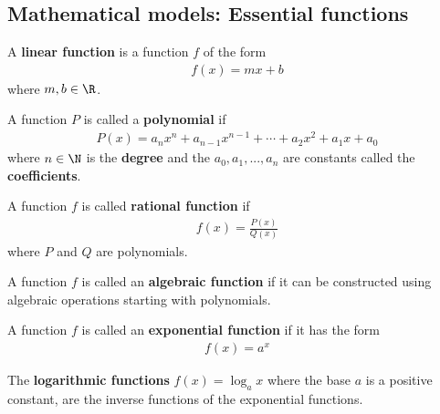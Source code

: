 \documentclass{article}
\begin{document}
\subsection{Mathematical models: Essential functions}
\begin{definition}
    A \textbf{linear function} is a function $f$ of the form
    \begin{align*}
        f(x) = mx + b
    \end{align*}
    where $m, b\in\R$.
\end{definition}
\begin{definition}
    A function $P$ is called a \textbf{polynomial} if
    \begin{align*}
        P(x) = a_nx^n+a_{n-1}x^{n-1}+\cdots +a_2x^2 + a_1x+a_0
    \end{align*}
    where $n\in\N$ is the \textbf{degree} and the $a_0, a_1, ..., a_n$ are constants called the \textbf{coefficients}.
\end{definition}
\begin{definition}
    A function $f$ is called \textbf{rational function} if
    \begin{align*}
        f(x) = \frac{P(x)}{Q(x)}
    \end{align*}
    where $P$ and $Q$ are polynomials.
\end{definition}
\begin{definition}
    A function $f$ is called an \textbf{algebraic function} if it can be constructed using algebraic operations starting with polynomials.
\end{definition}
\begin{definition}
    A function $f$ is called an \textbf{exponential function} if it has the form
    \begin{align*}
        f(x) = a^x
    \end{align*}
\end{definition}
\begin{definition}
    The \textbf{logarithmic functions} $f(x) = \log_ax$ where the base $a$ is a positive constant, are the inverse functions of the exponential functions.
\end{definition}
\end{document}

